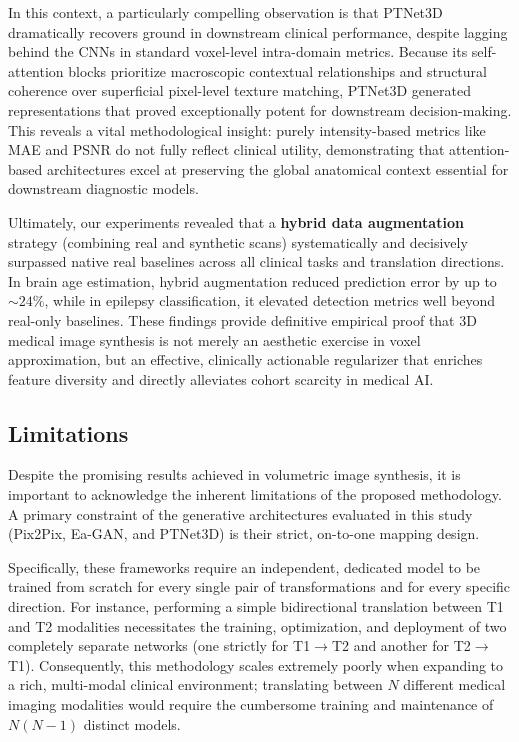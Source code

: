 \documentclass[11pt,a4paper]{article}
\begin{document}
In this context, a particularly compelling observation is that PTNet3D dramatically recovers ground in downstream clinical performance, despite lagging behind the CNNs in standard voxel-level intra-domain metrics. Because its self-attention blocks prioritize macroscopic contextual relationships and structural coherence over superficial pixel-level texture matching, PTNet3D generated representations that proved exceptionally potent for downstream decision-making. This reveals a vital methodological insight: purely intensity-based metrics like MAE and PSNR do not fully reflect clinical utility, demonstrating that attention-based architectures excel at preserving the global anatomical context essential for downstream diagnostic models.

Ultimately, our experiments revealed that a \textbf{hybrid data augmentation} strategy (combining real and synthetic scans) systematically and decisively surpassed native real baselines across all clinical tasks and translation directions. In brain age estimation, hybrid augmentation reduced prediction error by up to $\sim 24\%$, while in epilepsy classification, it elevated detection metrics well beyond real-only baselines. These findings provide definitive empirical proof that 3D medical image synthesis is not merely an aesthetic exercise in voxel approximation, but an effective, clinically actionable regularizer that enriches feature diversity and directly alleviates cohort scarcity in medical AI.

\subsection{Limitations}
Despite the promising results achieved in volumetric image synthesis, it is important to acknowledge the inherent limitations of the proposed methodology. A primary constraint of the generative architectures evaluated in this study (Pix2Pix, Ea-GAN, and PTNet3D) is their strict, on-to-one mapping design. 

Specifically, these frameworks require an independent, dedicated model to be trained from scratch for every single pair of transformations and for every specific direction. For instance, performing a simple bidirectional translation between T1 and T2 modalities necessitates the training, optimization, and deployment of two completely separate networks (one strictly for T1$\rightarrow$T2 and another for T2$\rightarrow$T1). Consequently, this methodology scales extremely poorly when expanding to a rich, multi-modal clinical environment; translating between $N$ different medical imaging modalities would require the cumbersome training and maintenance of $N(N-1)$ distinct models. 
\end{document}
